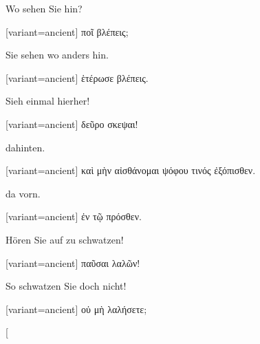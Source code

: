 Wo sehen Sie hin? 

\switchcolumn

\begin{greek}[variant=ancient]%
ποῖ βλέπεις;

\end{greek}%
\switchcolumn*

Sie sehen wo anders hin. 

\switchcolumn

\begin{greek}[variant=ancient]%
ἑτέρωσε βλέπεις.

\end{greek}%
\switchcolumn*

Sieh einmal hierher! 

\switchcolumn

\begin{greek}[variant=ancient]%
δεῦρο σκεψαι!

\end{greek}%
\switchcolumn*

\myafterpagetrue{}dahinten. 

\switchcolumn

\begin{greek}[variant=ancient]%
καὶ μὴν αἰσθάνομαι ψόφου τινός ἐξόπισθεν.

\end{greek}%
\myafterpagefalse\switchcolumn*\bgroup

da vorn. 

\egroup\switchcolumn

\begin{greek}[variant=ancient]%
ἐν τῷ πρόσθεν.

\end{greek}%
\switchcolumn*

Hören Sie auf zu schwatzen! 

\switchcolumn

\begin{greek}[variant=ancient]%
παῦσαι λαλῶν!

\end{greek}%
\switchcolumn*

So schwatzen Sie doch nicht! 

\switchcolumn

\begin{greek}[variant=ancient]%
οὐ μὴ λαλήσετε;

\end{greek}%
\switchcolumn*[


